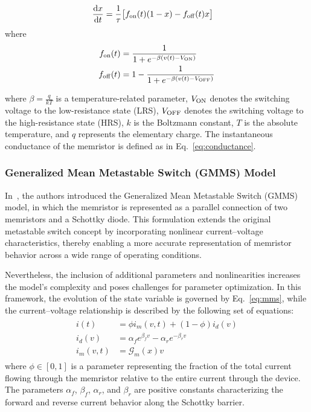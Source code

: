 \documentclass[lettersize,journal]{IEEEtran}
\newcommand{\G}{\mathcal{G}}
\newcommand{\von}{V_{\rm ON}}
\newcommand{\voff}{V_{\rm OFF}}
\newcommand{\ua}{v}
\newcommand{\dert}[1]{\frac{{\rm d} {#1}}{{\rm d} t} }
\begin{document}
\begin{align}
  \label{eq:mms}
  \dert{x} & = \frac{1}{\tau} \big[ f_{\rm on}(t) (1-x) - f_{\rm off}(t) x \big]
\end{align}
where
\begin{align}
  f_{\rm on}(t)  & = \frac{1}{1+e^{-\beta (\ua(t)-\von)}} \label{eq:mms5b}      \\
  f_{\rm off}(t) & = 1 - \frac{1}{1+e^{-\beta (\ua(t)-\voff)}} \label{eq:mms5c}
\end{align}

where \(\beta= \frac{q}{kT}\) is a temperature-related parameter, \(\von\) denotes the switching voltage to the low-resistance state (LRS), \(\voff\) denotes the switching voltage to the high-resistance state (HRS), \(k\) is the Boltzmann constant, \(T\) is the absolute temperature, and \(q\) represents the elementary charge. The instantaneous conductance of the memristor is defined as in Eq.~\eqref{eq:conductance}.

\subsubsection{Generalized Mean Metastable Switch (GMMS) Model}
In~\autocite{Molter2016, Ostrovskii2021}, the authors introduced the Generalized Mean Metastable Switch (GMMS) model, in which the memristor is represented as a parallel connection of two memristors and a Schottky diode. This formulation extends the original metastable switch concept by incorporating nonlinear current--voltage characteristics, thereby enabling a more accurate representation of memristor behavior across a wide range of operating conditions.

Nevertheless, the inclusion of additional parameters and nonlinearities increases the model's complexity and poses challenges for parameter optimization. In this framework, the evolution of the state variable is governed by Eq.~\eqref{eq:mms}, while the current--voltage relationship is described by the following set of equations:
\begin{align}
  \begin{split}
    i(t)      & = \phi i_m(v, t) + (1-\phi) i_d(v)                 \\
    i_d(v)    & = \alpha_f e^{\beta_f v} - \alpha_r e^{-\beta_r v} \\
    i_m(v, t) & = \G_m(x) v
  \end{split}
  \label{eq:gmms}
\end{align}
where \(\phi \in [0,1]\) is a parameter representing the fraction of the total current flowing through the memristor relative to the entire current through the device. The parameters \(\alpha_f\), \(\beta_f\), \(\alpha_r\), and \(\beta_r\) are positive constants characterizing the forward and reverse current behavior along the Schottky barrier.
\end{document}

